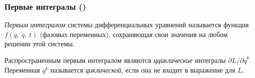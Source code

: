 \subsubsection*{Первые интегралы \textnormal{()}}

\begin{to_def} 
    \textit{Первым интегралом} системы дифференциальных уравнений называется функция $f(q,\ \dot{q}, \ t)$  (фазовых переменных), сохраняющая свои значения на любом решении этой системы.
\end{to_def}

\begin{to_def} 
    Распространенным первым интегралом являются \textit{цциклические} интегралы $\partial L / \partial \dot{q}^k$. Переменная $q^k$ называется \textit{циклической}, если она не входит в выражение для $L$.  
\end{to_def}






